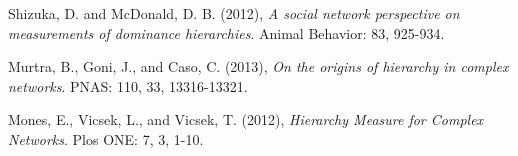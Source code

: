 \documentclass[3p,times]{elsarticle}
\begin{document}
\begin{thebibliography}{9}
	Shizuka, D. and McDonald, D. B. (2012),
	\textit{A social network perspective on measurements of dominance hierarchies}. 
	Animal Behavior: 83, 925-934.
	
	Murtra, B., Goni, J., and Caso, C. (2013),
	\textit{On the origins of hierarchy in complex networks}. 
	PNAS: 110, 33, 13316-13321.

	Mones, E., Vicsek, L., and Vicsek, T. (2012),
	\textit{Hierarchy Measure for Complex Networks}. 
	Plos ONE: 7, 3, 1-10.
\end{thebibliography}


\end{document}
